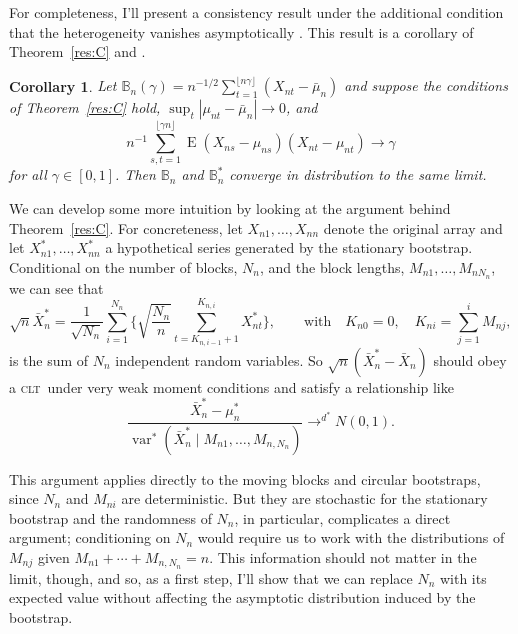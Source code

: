 \documentclass[12pt]{article}
\newtheorem{cor}[thm]{Corollary}
\theoremstyle{definition}
\DeclareMathOperator{\E}{E}
\DeclareMathOperator{\var}{var}
\newcommand{\clt}{\textsc{clt}}
\begin{document}
For completeness, I'll present a consistency result under the
additional condition that the heterogeneity vanishes asymptotically
\citep[similar to Assumption 2.2 of][]{GoW:02}.  This result is a
corollary of Theorem~\ref{res:C} and \citet[Theorem 3.1]{JoD:00b}.

\begin{cor}\label{res:F} Let $\mathbb{B}_n(\gamma) = n^{-1/2} \sum_{t=1}^{\lfloor n \gamma \rfloor} (X_{nt} -
  \bar{\mu}_{n})$ and suppose the conditions of Theorem~\ref{res:C}
  hold, $\sup_t |\mu_{nt} - \bar{\mu}_n| \to 0$, and
  \begin{equation}
    n^{-1} \sum_{s,t=1}^{\lfloor \gamma n \rfloor} \E (X_{ns} -
    \mu_{ns}) (X_{nt} - \mu_{nt}) \to \gamma
  \end{equation}
  for all $\gamma \in [0,1]$.  Then $\mathbb{B}_n$ and
  $\mathbb{B}_n^{*}$ converge in distribution to the same limit.
\end{cor}

We can develop some more intuition by looking at the argument behind
Theorem~\ref{res:C}.  For concreteness, let $X_{n1},\dots,X_{nn}$
denote the original array and let $X_{n1}^{*},\dots,X_{nn}^{*}$ a
hypothetical series generated by the stationary bootstrap.
Conditional on the number of blocks, $N_n$, and the block lengths,
$M_{n1},\dots,M_{nN_n}$, we can see that
\begin{equation}
  \sqrt{n} \bar{X}^{*}_n = \frac{1}{\sqrt{N_n}} \sum_{i=1}^{N_n}
  \Bigg\{\sqrt{\frac{N_n}{n}} \sum_{t=K_{n,i-1}+1}^{K_{n,i}} X_{nt}^{*} \Bigg\},\qquad\text{with}\quad K_{n0} = 0,
  \quad K_{ni} = \sum_{j=1}^i M_{nj},
\end{equation} 
is the sum of $N_n$ independent random variables.  So $\sqrt{n}
(\bar{X}^{*}_n - \bar{X}_n)$ should obey a \clt\ under very weak moment
conditions and satisfy a relationship like
\begin{equation}
  \label{eq:10}
  \frac{\bar{X}_n^{*} - \mu_n^{*}}{\var^{*}(\bar{X}_n^{*} \mid
    M_{n1},\dots,M_{n,N_n})} \to^{d^{*}} N(0,1).
\end{equation}

This argument applies directly to the moving blocks and circular
bootstraps, since $N_n$ and $M_{ni}$ are deterministic.  But they are
stochastic for the stationary bootstrap and the randomness of $N_n$,
in particular, complicates a direct argument; conditioning on $N_n$
would require us to work with the distributions of $M_{nj}$ given
$M_{n1} + \cdots + M_{n,N_n} = n$.  This information should not matter
in the limit, though, and so, as a first step, I'll show that we can
replace $N_n$ with its expected value without affecting the asymptotic
distribution induced by the bootstrap.
\end{document}
